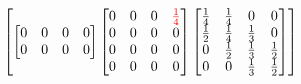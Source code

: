 {$$\begin{bmatrix}
\begin{bmatrix}
0 & 0 & 0 & 0 \\
0 & 0 & 0 & 0 \\
\end{bmatrix}
\begin{bmatrix}
0 & 0 & 0 & \textcolor{red}{\frac{1}{4}} \\
0 & 0 & 0 & 0 \\
0 & 0 & 0 & 0 \\
0 & 0 & 0 & 0 \\
\end{bmatrix}
\begin{bmatrix}
\frac{1}{4} & \frac{1}{4} & 0 & 0 \\
\frac{1}{2} & \frac{1}{4} & \frac{1}{3} & 0  \\
0 & \frac{1}{2} & \frac{1}{3} & \frac{1}{2} \\
0 & 0 & \frac{1}{3} & \frac{1}{2}  \\
\end{bmatrix}
\end{bmatrix}
$$

}

%



